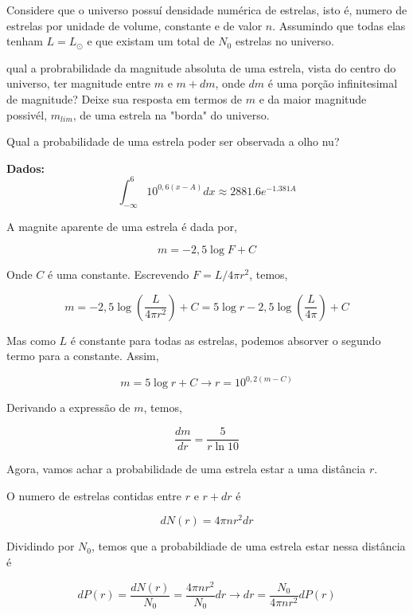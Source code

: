\documentclass[11pt]{article}
\begin{document}
\begin{pproblem}
    Considere que o universo possuí densidade numérica de estrelas, isto é, numero de estrelas por unidade de volume, constante e de valor \(n\). Assumindo que todas elas tenham \(L = L_\odot\) e que existam um total de \(N_0\) estrelas no universo.
    
    \begin{alternativas}
    \item qual a probrabilidade da magnitude absoluta de uma estrela, vista do centro do universo, ter magnitude entre \(m\) e \(m+dm\), onde \(dm\) é uma porção infinitesimal de magnitude? Deixe sua resposta em termos de \(m\) e da maior magnitude possivél, \(m_{lim}\), de uma estrela na "borda" do universo.

    \item Qual a probabilidade de uma estrela poder ser observada a olho nu?
    
    \textbf{Dados:} \[\int_{-\infty}^{6}10^{0,6(x-A)}dx \approx 2881.6 e^{-1.381 A}\]
    \end{alternativas}\begin{pssolution*}{}{}
    \begin{alternativas}
    \item A magnite aparente de uma estrela é dada por, 

    \[m = -2,5\log F + C\]

    Onde \(C\) é uma constante. Escrevendo \(F = L/4\pi r^2\), temos, 

    \[m = -2,5\log\left(\frac{L}{4\pi r^2}\right) + C = 5\log r -2,5 \log \left(\frac{L}{4\pi}\right)+ C\]

    Mas como \(L\) é constante para todas as estrelas, podemos absorver o segundo termo para a constante. Assim, 

    \[m=5\log r + C \rightarrow r = 10^{0,2(m-C)}\]

    Derivando a expressão de \(m\), temos, 

    \[\frac{dm}{dr} = \frac{5}{r\ln 10}\]

    Agora, vamos achar a probabilidade de uma estrela estar a uma distância \(r\).

    O numero de estrelas contidas entre \(r\) e \(r+dr\) é 

    \[dN(r) = 4\pi n r^2dr\]

    Dividindo por \(N_0\), temos que a probabildiade de uma estrela estar nessa distância é 

    \[dP(r) = \frac{dN(r)}{N_0} = \frac{4\pi n r^2}{N_0}dr \rightarrow dr = \frac{N_0}{4\pi n r^2} dP(r)\]


\end{alternativas}
\end{pssolution*}
\end{pproblem}
\end{document}
